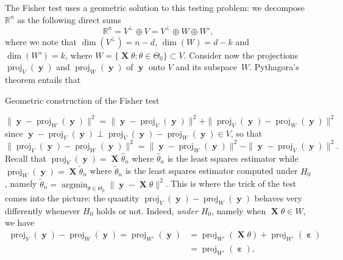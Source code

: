 \documentclass[
	fontsize=11pt, %
	twoside=false, %
	numbers=noenddot, %
]{kaobook}
\DeclareMathOperator{\bX}{{\boldsymbol X}}
\DeclareMathOperator{\by}{{\boldsymbol y}}
\DeclareMathOperator{\beps}{\boldsymbol \varepsilon}
\DeclareMathOperator*{\argmin}{argmin}
\DeclareMathOperator{\proj}{proj}
\newcommand{\R}{\mathbb R}
\newcommand{\wh}{\widehat}
\newcommand{\wt}{\widetilde}
\newcommand{\norm}[1]{\| #1 \|}
\begin{document}
The Fisher test uses a geometric solution to this testing problem: we decompose $\R^n$ as the following direct sums
\begin{equation*}
	\R^n = V^\perp \oplus V = V^\perp \oplus W \oplus W',
\end{equation*}
where we note that $\dim(V^\perp) = n - d$, $\dim(W) = d - k$ and $\dim(W') = k$, where $W = \{ \bX \theta : \theta \in \Theta_0 \} \subset V$.
Consider now the projections $\proj_V(\by)$ and $\proj_W(\by)$ of $\by$ onto $V$ and its subspace~$W$.
Pythagora's theorem entails that%
\begin{marginfigure}%
%
\caption{Geometric construction of the Fisher test}
\end{marginfigure}%
\begin{equation*}
	\norm{\by - \proj_W(\by)}^2 = \norm{\by - \proj_V(\by)}^2 + \norm{\proj_V(\by) - \proj_W(\by)}^2
\end{equation*}
since $\by - \proj_V(\by) \perp \proj_V(\by) - \proj_W(\by) \in V$, so that 
\begin{equation*}
	\norm{\proj_V(\by) - \proj_W(\by)}^2 = \norm{\by - \proj_W(\by)}^2 - \norm{\by - \proj_V(\by)}^2.
\end{equation*}
Recall that $\proj_V(\by) = \bX \wh \theta_n$ where $\wh \theta_n$ is the least squares estimator while $\proj_W(\by) = \bX \wt \theta_n$ where $\wt \theta_n$ is the least squares estimator computed under $H_0$, namely $\wt \theta_n = \argmin_{\theta \in \Theta_0} \norm{\by - \bX \theta}^2$.
This is where the trick of the test comes into the picture: the quantity $\proj_V(\by) - \proj_W(\by)$ behaves very differently whenever $H_0$ holds or not. 
Indeed, \emph{under $H_0$}, namely when $\bX \theta \in W$, we have
\begin{align*}
	\proj_V(\by) - \proj_W(\by) = \proj_{W'} (\by) &= \proj_{W'}(\bX \theta) + \proj_{W'}(\beps) \\
	&= \proj_{W'}(\beps),
\end{align*}
\end{document}
